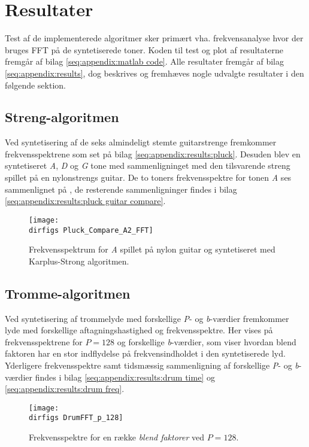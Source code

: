 \section{Resultater}

Test af de implementerede algoritmer sker primært vha. frekvensanalyse hvor der bruges FFT på de syntetiserede toner. Koden til test og plot af resultaterne fremgår af bilag \ref{seq:appendix:matlab code}. Alle resultater fremgår af bilag \ref{seq:appendix:results}, dog beskrives og fremhæves nogle udvalgte resultater i den følgende sektion.

\subsection{Streng-algoritmen}

Ved syntetisering af de seks almindeligt stemte guitarstrenge fremkommer frekvensspektrene som set på bilag \ref{seq:appendix:results:pluck}.
Desuden blev en syntetiseret \textit{A}, \textit{D} og \textit{G} tone med sammenligninget med den tilsvarende streng spillet på en nylonstrengs guitar.
De to toners frekvensspektre for tonen \textit{A} ses sammenlignet på , de resterende sammenligninger findes i bilag \ref{seq:appendix:results:pluck guitar compare}.

\begin{figure}[!ht]
  \centering
  \texttt{[image: \\dirfigs Pluck\_Compare\_A2\_FFT]}
  \caption{Frekvensspektrum for \textit{A} spillet på nylon guitar og syntetiseret med Karplus-Strong algoritmen.}
  \label{fig:pluck compare A2 fft}
\end{figure}

\subsection{Tromme-algoritmen}

Ved syntetisering af trommelyde med forskellige \textit{P}- og \textit{b}-værdier fremkommer lyde med forskellige aftagningshastighed og frekvensspektre.
Her vises på  frekvensspektrene for \(P=128\) og forskellige \textit{b}-værdier, som viser hvordan blend faktoren har en stor indflydelse på frekvensindholdet i den syntetiserede lyd.
Yderligere frekvensspektre samt tidsmæssig sammenligning af forskellige \textit{P}- og \textit{b}-værdier findes i bilag \ref{seq:appendix:results:drum time} og \ref{seq:appendix:results:drum freq}.

\begin{figure}[!ht]
  \centering
  \texttt{[image: \\dirfigs DrumFFT\_p\_128]}
  \caption{Frekvensspektre for en række \textit{blend faktorer} ved \(P=128\).}
  \label{fig:drum fft p=128}
\end{figure}

